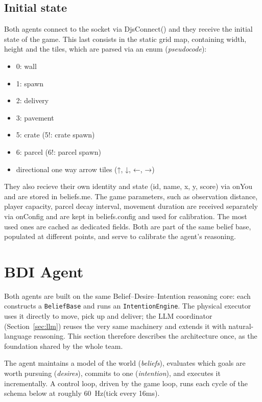 \documentclass[a4paper,11pt]{article}
\begin{document}
\subsection{Initial state}
Both agents connect to the socket via DjsConnect() and they receive the initial state of the game.
This last consists in the static grid map, containing width, height and the tiles, which are parsed via an enum (\textit{pseudocode}):
\begin{itemize}
    \item 0: wall 
    \item 1: spawn
    \item 2: delivery
    \item 3: pavement
    \item 5: crate (5!: crate spawn)
    \item 6: parcel (6!: parcel spawn)
    \item directional one way arrow tiles (↑, ↓, ←, →)
\end{itemize}
They also recieve their own identity and state (id, name, x, y, score) via onYou and are stored in beliefs.me.
The game parameters, such as observation distance, player capacity, parcel decay interval, 
movement duration are received separately via onConfig and are kept in beliefs.config and used for calibration. 
The most used ones are cached as dedicated fields.
Both are part of the same belief base, populated at different points, 
and serve to calibrate the agent's reasoning.




\section{BDI Agent}

Both agents are built on the same Belief--Desire--Intention reasoning core: each
constructs a \texttt{BeliefBase} and runs an \texttt{IntentionEngine}. The physical
executor uses it directly to move, pick up and deliver; the LLM coordinator
(Section~\ref{sec:llm}) reuses the very same machinery and extends it with
natural-language reasoning. This section therefore describes the architecture once,
as the foundation shared by the whole team.

The agent maintains a model of the world (\emph{beliefs}), evaluates which goals
are worth pursuing (\emph{desires}), commits to one (\emph{intention}), and
executes it incrementally. A control loop, driven by the game loop, runs each cycle
of the schema below at roughly \SI{60}{\hertz}(tick every 16ms).
\end{document}

